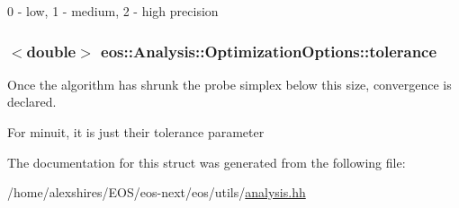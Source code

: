 0 -\/ low, 1 -\/ medium, 2 -\/ high precision \hypertarget{structeos_1_1Analysis_1_1OptimizationOptions_a99ab6b40de3f1bdd8218dd2028459ffe}{
\subsubsection[{tolerance}]{$<$double$>$ {\bf eos::Analysis::OptimizationOptions::tolerance}}}
\label{structeos_1_1Analysis_1_1OptimizationOptions_a99ab6b40de3f1bdd8218dd2028459ffe}
Once the algorithm has shrunk the probe simplex below this size, convergence is declared.

For minuit, it is just their tolerance parameter 

The documentation for this struct was generated from the following file:\begin{DoxyCompactItemize}
\item 
/home/alexshires/EOS/eos-\/next/eos/utils/\hyperlink{analysis_8hh}{analysis.hh}\end{DoxyCompactItemize}
